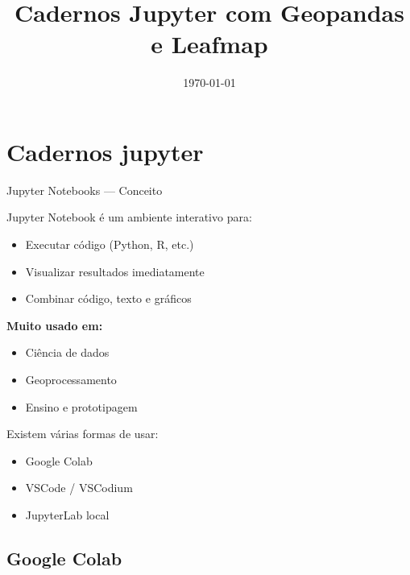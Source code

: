 \documentclass{beamer}
\title{Cadernos Jupyter com Geopandas e Leafmap}
\date{\today}
\begin{document}
    


\sumario

\section{Cadernos jupyter}


\begin{frame}{Jupyter Notebooks — Conceito}
    
    Jupyter Notebook é um ambiente interativo para:
    
    \begin{itemize}
        \item Executar código (Python, R, etc.)
        \item Visualizar resultados imediatamente
        \item Combinar código, texto e gráficos
    \end{itemize}
    
    \vspace{0.4cm}
    
    \textbf{Muito usado em:}
    
    \begin{itemize}
        \item Ciência de dados
        \item Geoprocessamento
        \item Ensino e prototipagem
    \end{itemize}
    
    \vspace{0.4cm}
    
    Existem várias formas de usar:
    
    \begin{itemize}
        \item Google Colab
        \item VSCode / VSCodium
        \item JupyterLab local
    \end{itemize}
    
\end{frame}

\subsection{Google Colab}
\end{document}
